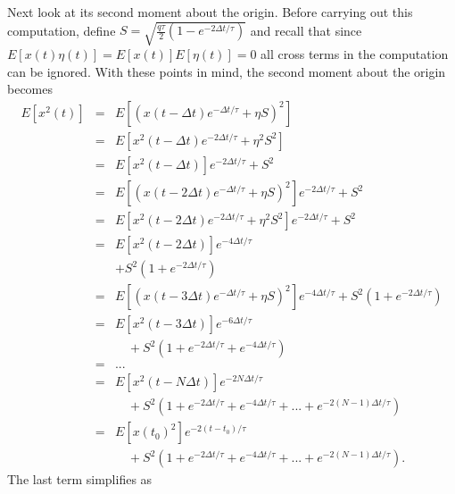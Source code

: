 \documentclass[10pt]{article}
\begin{document}
Next look at its second moment about the origin.  Before carrying out this computation, define 
$S = \sqrt{ \frac{q\tau}{2}\left(1-e^{-2 \Delta t/\tau}\right)}$ and recall that since $E[x(t) \eta(t)] = E[x(t)] E[\eta(t)] = 0$
all cross terms in the computation can be ignored.  With these points in mind, the second moment about the origin becomes
\begin{eqnarray}\label{numer_2nd_moment}
  E\left[x^2 (t)         \right] & = & E\left[ \left( x(t - \Delta t) e^{-\Delta t/\tau} + \eta S \right)^2 \right] \nonumber \\
                                 & = & E\left[ x^2(t - \Delta t)      e^{-2\Delta t/\tau} + \eta^2 S^2\right] \nonumber \\
								 & = & E\left[x^2(t - \Delta t)\right]e^{-2\Delta t/\tau} + S^2 \nonumber \\
								 & = & E\left[\left(x(t-2 \Delta t)e^{-\Delta t/\tau} + \eta S\right)^2\right]e^{-2\Delta t/\tau} + S^2\nonumber \\
								 & = & E\left[x^2(t-2\Delta t) e^{-2\Delta t/\tau} + \eta^2 S^2\right]e^{-2\Delta t/\tau} + S^2 \nonumber \\
								 & = & E\left[x^2(t-2\Delta t)\right]e^{-4\Delta t/\tau} \nonumber \\
								 &   & + S^2\left(1+e^{-2\Delta t/\tau}\right) \nonumber \\
								 & = & E\left[\left(x(t-3\Delta t)e^{-\Delta t/\tau} + \eta S\right)^2\right]e^{-4\Delta t/\tau} 								       + S^2\left(1+e^{-2\Delta t/\tau}\right) \nonumber \\
								 & = & E\left[x^2(t-3\Delta t)\right] e^{-6\Delta t/\tau} \nonumber \\
								 &   & \quad + S^2 \left(1+e^{-2\Delta t/\tau}+e^{-4\Delta t/\tau}\right) \nonumber \\
								 & = & ... \nonumber \\
								 & = & E\left[x^2(t-N\Delta t)\right] e^{-2 N \Delta t/\tau} \nonumber \\
								 &   &  \quad + S^2\left(1+e^{-2 \Delta t/\tau} + e^{-4\Delta t/\tau}+
								                         ...+e^{-2(N-1) \Delta t/\tau}\right) \nonumber \\
								 & = & E\left[x(t_0)^2\right] e^{-2(t-t_{0})/\tau} \nonumber \\
								 &   & \quad + S^2\left(1+e^{-2 \Delta t/\tau}+e^{-4\Delta t/\tau}+...+e^{-2(N-1) \Delta t/\tau}\right).
\end{eqnarray}
 The last term simplifies as
\end{document}
